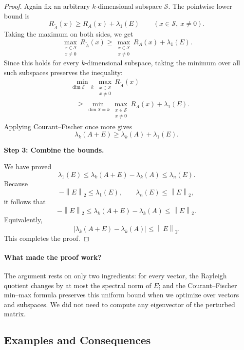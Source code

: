 \documentclass[14pt,letterpaper]{article}
\theoremstyle{plain}
\theoremstyle{definition}
\theoremstyle{remark}
\newcommand{\norm}[1]{\left\lVert #1 \right\rVert}
\newcommand{\abs}[1]{\left| #1 \right|}
\begin{document}
\begin{proof}
Again fix an arbitrary $k$-dimensional subspace
$\mathcal S$. The pointwise lower bound is
\[
R_{\widetilde A}(x)
\geq R_A(x)+\lambda_1(E)
\qquad(x\in\mathcal S,\ x\neq0).
\]
Taking the maximum on both sides, we get
\[
\max_{\substack{x\in\mathcal S\\x\neq0}}
R_{\widetilde A}(x)
\geq
\max_{\substack{x\in\mathcal S\\x\neq0}}
R_A(x)+\lambda_1(E).
\]
Since this holds for every $k$-dimensional
subspace, taking the minimum over all such
subspaces preserves the inequality:
\[
\begin{aligned}
&\min_{\dim\mathcal S=k}
\max_{\substack{x\in\mathcal S\\x\neq0}}
R_{\widetilde A}(x)\\
&\quad\geq
\min_{\dim\mathcal S=k}
\max_{\substack{x\in\mathcal S\\x\neq0}}
R_A(x)+\lambda_1(E).
\end{aligned}
\]
Applying Courant--Fischer once more gives
\[
\boxed{
\lambda_k(A+E)
\geq\lambda_k(A)+\lambda_1(E).
}
\]

\medskip
\noindent\textbf{Step 3: Combine the bounds.}

We have proved
\[
\lambda_1(E)
\leq\lambda_k(A+E)-\lambda_k(A)
\leq\lambda_n(E).
\]
Because
\[
-\norm{E}_2\leq\lambda_1(E),
\qquad
\lambda_n(E)\leq\norm{E}_2,
\]
it follows that
\[
-\norm{E}_2
\leq\lambda_k(A+E)-\lambda_k(A)
\leq\norm{E}_2.
\]
Equivalently,
\[
\boxed{
\abs{\lambda_k(A+E)-\lambda_k(A)}
\leq\norm{E}_2.
}
\]
This completes the proof.
\end{proof}

\paragraph{What made the proof work?}
The argument rests on only two ingredients:
for every vector, the Rayleigh quotient changes
by at most the spectral norm of $E$; and the
Courant--Fischer min--max formula preserves
this uniform bound when we optimize over vectors
and subspaces. We did not need to compute any
eigenvector of the perturbed matrix.


\subsection{Examples and Consequences}
\label{subsec:weyl_examples}
\end{document}
